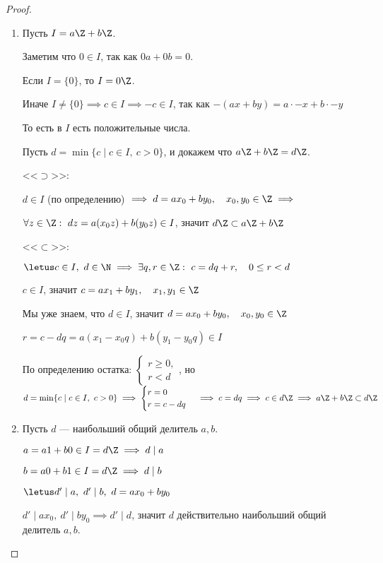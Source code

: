 \begin{proof}~
    \begin{enumerate}
        \item Пусть $I = a\Z + b\Z$.
        
        Заметим что $0 \in I$, так как $0a + 0b = 0$.
        
        Если $I = \{0\}$, то $I = 0\Z$.
        
        Иначе $I \neq \{0\} \implies c \in I \implies -c \in I$, так как $-(ax + by) = a \cdot -x + b \cdot -y$
        
        То есть в $I$ есть положительные числа.
        
        Пусть $d = \min\{ c \mid c \in I,~ c > 0 \}$, и докажем что $a\Z + b\Z = d\Z$.
        
        <<$\supset$>>:
        
        $d \in I$ (по определению) $\implies d = ax_0 + by_0, \quad x_0, y_0 \in \Z \implies$
        
        $\forall z \in \Z:\ dz = a(x_0z) + b(y_0z) \in I$, значит $d\Z \subset a\Z + b\Z$
        
        <<$\subset$>>:
        
        $\letus c \in I,~ d \in \N \implies \exists q, r \in \Z:\ c = dq + r, \quad 0 \leq r < d$
        
        $c \in I$, значит $c = ax_1 + by_1, \quad x_1, y_1 \in \Z$
        
        Мы уже знаем, что $d \in I$, значит $d = ax_0 + by_0, \quad x_0, y_0 \in \Z$ 
        
        $r = c - dq = a(x_1 -x_0q) + b(y_1 - y_0q) \in I$

        По определению остатка: $\begin{cases} 
            r \geq 0,\\
            r < d 
        \end{cases}$, но $d = \min\{ c \mid c \in I,~ c > 0 \} \implies \begin{cases}
            r = 0 \\
            r = c - dq 
        \end{cases} \implies c = dq \implies c \in d\Z \implies a\Z + b\Z \subset d\Z$
        
        \item Пусть $d$ --- наибольший общий делитель $a, b$.
        
        $a = a1 + b0 \in I = d\Z \implies d \mid a$
        
        $b = a0 + b1 \in I = d\Z \implies d \mid b$
        
        $\letus d' \mid a,~d' \mid b,~d=ax_0 + by_0$
        
        $d' \mid ax_0,~d' \mid by_0 \implies d' \mid d$, значит $d$ действительно наибольший общий делитель $a, b$.
    \end{enumerate}
\end{proof}

